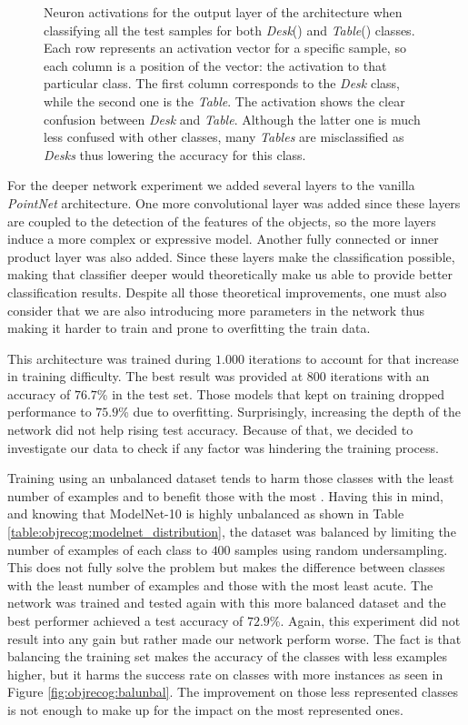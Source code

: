 \begin{figure}[!htb]
    \caption{Neuron activations for the output layer of the architecture when classifying all the test samples for both \emph{Desk}() and \emph{Table}() classes. Each row represents an activation vector for a specific sample, so each column is a position of the vector: the activation to that particular class. The first column corresponds to the \emph{Desk} class, while the second one is the \emph{Table}. The activation shows the clear confusion between \emph{Desk} and \emph{Table}. Although the latter one is much less confused with other classes, many \emph{Tables} are misclassified as \emph{Desks} thus lowering the accuracy for this class.}
    \label{fig:objrecog:tabledesk_activations}
\end{figure}

For the deeper network experiment we added several layers to the vanilla \emph{PointNet} architecture. One more convolutional layer was added since these layers are coupled to the detection of the features of the objects, so the more layers induce a more complex or expressive model. Another fully connected or inner product layer was also added. Since these layers make the classification possible, making that classifier deeper would theoretically make us able to provide better classification results. Despite all those theoretical improvements, one must also consider that we are also introducing more parameters in the network thus making it harder to train and prone to overfitting the train data.

This architecture was trained during $1.000$ iterations to account for that increase in training difficulty. The best result was provided at $800$ iterations with an accuracy of $76.7$\% in the test set. Those models that kept on training dropped performance to $75.9$\% due to overfitting. Surprisingly, increasing the depth of the network did not help rising test accuracy. Because of that, we decided to investigate our data to check if any factor was hindering the training process.

Training using an unbalanced dataset tends to harm those classes with the least number of examples and to benefit those with the most \cite{Dalyak2014}. Having this in mind, and knowing that ModelNet-10 is highly unbalanced as shown in Table \ref{table:objrecog:modelnet_distribution}, the dataset was balanced by limiting the number of examples of each class to $400$ samples using random undersampling. This does not fully solve the problem but makes the difference between classes with the least number of examples and those with the most least acute. The network was trained and tested again with this more balanced dataset and the best performer achieved a test accuracy of $72.9$\%. Again, this experiment did not result into any gain but rather made our network perform worse. The fact is that balancing the training set makes the accuracy of the classes with less examples higher, but it harms the success rate on classes with more instances as seen in Figure \ref{fig:objrecog:balunbal}. The improvement on those less represented classes is not enough to make up for the impact on the most represented ones.


